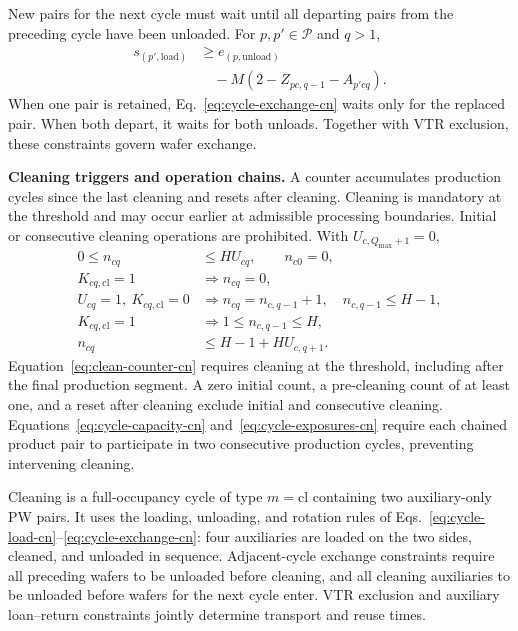 \documentclass[final,5p,times,twocolumn]{elsarticle}
\begin{document}
New pairs for the next cycle must wait until all departing pairs from the preceding cycle have been unloaded. For $p,p'\in\mathcal P$ and $q>1$,
\begin{equation}
\begin{aligned}
s_{(p',\mathrm{load})}&\ge e_{(p,\mathrm{unload})}\\
&\quad-M(2-Z_{pc,q-1}-A_{p'cq}).
\end{aligned}
\label{eq:cycle-exchange-cn}
\end{equation}
When one pair is retained, Eq.~\eqref{eq:cycle-exchange-cn} waits only for the replaced pair. When both depart, it waits for both unloads. Together with VTR exclusion, these constraints govern wafer exchange.

\noindent\textbf{Cleaning triggers and operation chains.}
A counter accumulates production cycles since the last cleaning and resets after cleaning. Cleaning is mandatory at the threshold and may occur earlier at admissible processing boundaries. Initial or consecutive cleaning operations are prohibited. With $U_{c,Q_{\max}+1}=0$,
\begin{equation}
\begin{aligned}
0\le n_{cq}&\le H U_{cq},\qquad n_{c0}=0,\\
K_{cq,\mathrm{cl}}=1&\Rightarrow n_{cq}=0,\\
U_{cq}=1,\ K_{cq,\mathrm{cl}}=0
&\Rightarrow n_{cq}=n_{c,q-1}+1,\quad n_{c,q-1}\le H-1,\\
K_{cq,\mathrm{cl}}=1&\Rightarrow 1\le n_{c,q-1}\le H,\\
n_{cq}&\le H-1+H U_{c,q+1}.
\end{aligned}
\label{eq:clean-counter-cn}
\end{equation}
Equation~\eqref{eq:clean-counter-cn} requires cleaning at the threshold, including after the final production segment. A zero initial count, a pre-cleaning count of at least one, and a reset after cleaning exclude initial and consecutive cleaning. Equations~\eqref{eq:cycle-capacity-cn} and~\eqref{eq:cycle-exposures-cn} require each chained product pair to participate in two consecutive production cycles, preventing intervening cleaning.

Cleaning is a full-occupancy cycle of type $m=\mathrm{cl}$ containing two auxiliary-only PW pairs. It uses the loading, unloading, and rotation rules of Eqs.~\eqref{eq:cycle-load-cn}--\eqref{eq:cycle-exchange-cn}: four auxiliaries are loaded on the two sides, cleaned, and unloaded in sequence. Adjacent-cycle exchange constraints require all preceding wafers to be unloaded before cleaning, and all cleaning auxiliaries to be unloaded before wafers for the next cycle enter. VTR exclusion and auxiliary loan--return constraints jointly determine transport and reuse times.
\end{document}
